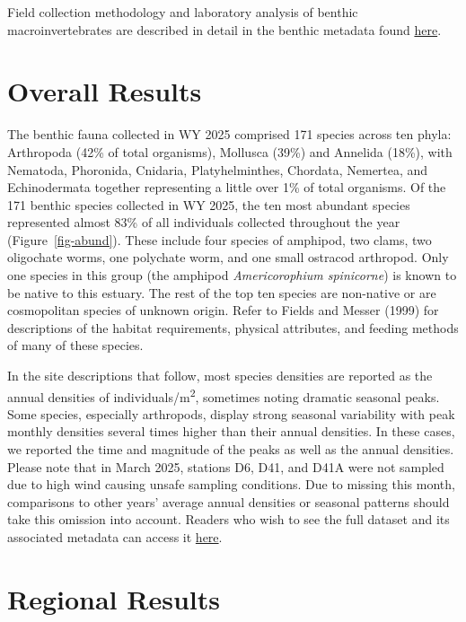\documentclass[
  letterpaper,
]{article}
\begin{document}
Field collection methodology and laboratory analysis of benthic
macroinvertebrates are described in detail in the benthic metadata found
\href{https://portal.edirepository.org/nis/mapbrowse?scope=edi&identifier=1036}{here}.

\section{Overall Results}\label{overall-results}

The benthic fauna collected in WY 2025 comprised 171 species across ten
phyla: Arthropoda (42\% of total organisms), Mollusca (39\%) and
Annelida (18\%), with Nematoda, Phoronida, Cnidaria, Platyhelminthes,
Chordata, Nemertea, and Echinodermata together representing a little
over 1\% of total organisms. Of the 171 benthic species collected in WY
2025, the ten most abundant species represented almost 83\% of all
individuals collected throughout the year (Figure~\ref{fig-abund}).
These include four species of amphipod, two clams, two oligochate worms,
one polychate worm, and one small ostracod arthropod. Only one species
in this group (the amphipod \emph{Americorophium spinicorne}) is known
to be native to this estuary. The rest of the top ten species are
non-native or are cosmopolitan species of unknown origin. Refer to
Fields and Messer (1999) for descriptions of the habitat requirements,
physical attributes, and feeding methods of many of these species.

In the site descriptions that follow, most species densities are
reported as the annual densities of individuals/m\textsuperscript{2},
sometimes noting dramatic seasonal peaks. Some species, especially
arthropods, display strong seasonal variability with peak monthly
densities several times higher than their annual densities. In these
cases, we reported the time and magnitude of the peaks as well as the
annual densities. Please note that in March 2025, stations D6, D41, and
D41A were not sampled due to high wind causing unsafe sampling
conditions. Due to missing this month, comparisons to other years'
average annual densities or seasonal patterns should take this omission
into account. Readers who wish to see the full dataset and its
associated metadata can access it
\href{https://portal.edirepository.org/nis/mapbrowse?packageid=edi.1036.6}{here}.

\section{Regional Results}\label{regional-results}
\end{document}
